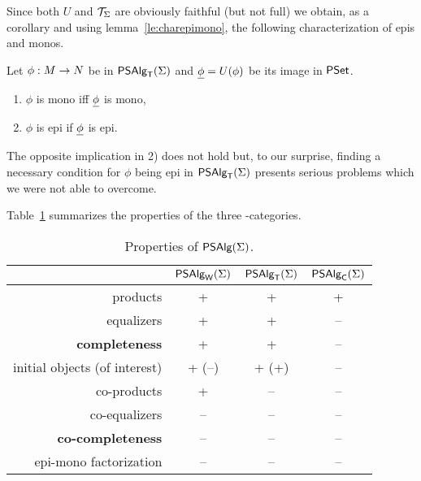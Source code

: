 \documentclass[10pt]{article}
\begin{document}
Since both $U$ and ${\cal T}_{\Sigma}$ are obviously
faithful (but not full) we obtain, as a corollary and using 
lemma~\ref{le:charepimono},
the following characterization of epis and monos.

\begin{Fact}
Let $\phi:M\rightarrow N$ be in $\mbox{\sf PSAlg}_{\sf T}(\Sigma)$ and $\underline {\phi}=U(\phi)$ be its
image in $\mbox{\rm\sf PSet}$.
\begin{enumerate}\MyLPar
\item $\phi$ is mono iff $\underline {\phi}$ is mono,
\item $\phi$ is epi if $\underline {\phi}$ is epi.
\end{enumerate}
\end{Fact}

\noindent
The opposite implication in 2) does not hold but, to our surprise, 
finding a necessary condition for $\phi$ being epi in $\mbox{\sf PSAlg}_{\sf T}(\Sigma)$ presents serious
problems which we were not able to overcome.

Table~\ref{tab:B} summarizes the properties of the three \PS-categories.

\begin{table}[htb] 
\begin{center}
\begin{tabular}{|r|c|c|c|}
\hline
    & $\mbox{\sf PSAlg}_{\sf W}(\Sigma)$ & $\mbox{\sf PSAlg}_{\sf T}(\Sigma)$ & $\mbox{\sf PSAlg}_{\sf C}(\Sigma)$ \\ \hline
products       &+ & +   & + \\
equalizers     &+ & +   & -- \\
{\bf completeness} &+ & +   & -- \\ \hline
initial objects (of interest) &+ (--) & + (+)  & -- \\
co-products    &+ & --  & -- \\
co-equalizers  &-- & --  & -- \\
{\bf co-completeness}&-- & -- & -- \\ \hline
epi-mono factorization   &-- & --   & -- \\ \hline
\end{tabular}
\caption{Properties of $\mbox{\sf PSAlg}(\Sigma)$.}\label{tab:B}
\end{center} \vspace*{-4ex}
\end{table} 


\end{document}
